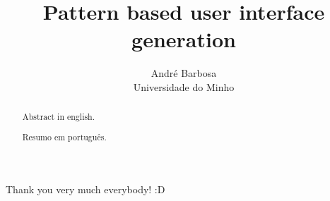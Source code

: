 \documentclass[a4paper,12pt,notitlepage,twoside,openright]{report}
\title{	Pattern based user interface generation }
\author{
	André Barbosa
	\\Universidade do Minho
}
\begin{document}
 

 

\setcounter{page}{2}


Thank you very much everybody! :D
\cleardoublepage


\begin{abstract}
Abstract in english.
\end{abstract}
\cleardoublepage



\begin{abstract}
Resumo em português.
\end{abstract}

\cleardoublepage
{}


\tableofcontents
\cleardoublepage






%
%





%
%
\end{document}
